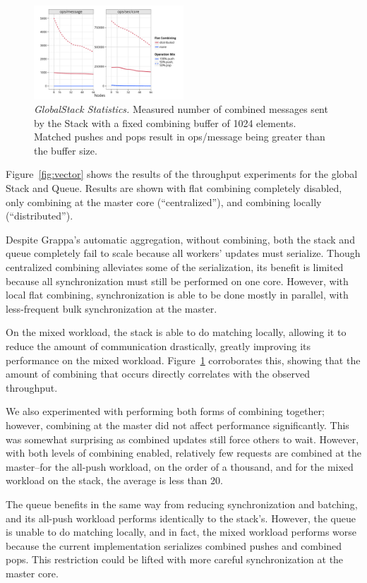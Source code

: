 \begin{figure}[t]
  \centering
  \includegraphics[width=0.5\textwidth]{data/plots/stack_stats.pdf}
  \caption{\emph{GlobalStack Statistics.}
    Measured number of combined messages sent by the Stack with a fixed combining buffer of 1024 elements.
    Matched pushes and pops result in ops/message being greater than the buffer size.
  }
  \label{fig:stack_stats}
\end{figure}

Figure~\ref{fig:vector} shows the results of the throughput experiments for the global Stack and Queue. Results are shown with flat combining completely disabled, only combining at the master core (``centralized''), and combining locally (``distributed'').

Despite Grappa's automatic aggregation, without combining, both the stack and queue completely fail to scale because all workers' updates must serialize.
Though centralized combining alleviates some of the serialization, its benefit is limited because all synchronization must still be performed on one core. However, with local flat combining, synchronization is able to be done mostly in parallel, with less-frequent bulk synchronization at the master.

On the mixed workload, the stack is able to do matching locally, allowing it to reduce the amount of communication drastically, greatly improving its performance on the mixed workload. Figure~\ref{fig:stack_stats} corroborates this, showing that the amount of combining that occurs directly correlates with the observed throughput.

We also experimented with performing both forms of combining together; however, combining at the master did not affect performance significantly. This was somewhat surprising as combined updates still force others to wait. However, with both levels of combining enabled, relatively few requests are combined at the master--for the all-push workload, on the order of a thousand, and for the mixed workload on the stack, the average is less than 20.

The queue benefits in the same way from reducing synchronization and batching, and its all-push workload performs identically to the stack's.
However, the queue is unable to do matching locally, and in fact, the mixed workload performs worse because the current implementation serializes combined pushes and combined pops. This restriction could be lifted with more careful synchronization at the master core.

